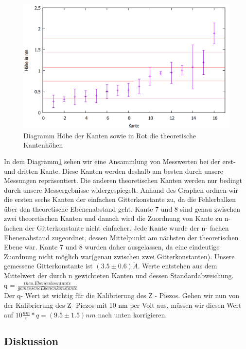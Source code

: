 \documentclass[10pt,a4paper]{article}
\begin{document}
\begin{figure}[]
	\includegraphics[scale = 0.5]{kantendiag.png}
	\centering
	\caption{Diagramm Höhe der Kanten sowie in Rot die theoretische Kantenhöhen}
	\label{kantendia}
\end{figure}

In dem Diagramm\ref{kantendia} sehen wir eine Ansammlung von Messwerten bei der erst- und dritten Kante. Diese Kanten werden deshalb am besten durch unsere Messungen repräsentiert. Die anderen theoretischen Kanten werden nur bedingt durch unsere Messergebnisse widergespiegelt.
Anhand des Graphen ordnen wir die ersten sechs Kanten der einfachen Gitterkonstante zu, da die Fehlerbalken über den theoretische Ebenenabstand geht. Kante 7 und 8 sind genau zwischen zwei theoretischen Kanten und danach wird die Zuordnung von Kante zu n-fachen der Gitterkonstante nicht einfacher.
Jede Kante wurde der n- fachen Ebenenabstand zugeordnet, dessen Mittelpunkt am nächsten der theoretischen Ebene war. Kante 7 und 8 wurden daher ausgelassen, da eine eindeutige Zuordnung nicht möglich war(genau zwischen zwei Gitterkonstanten). Unsere gemessene Gitterkonstante ist $(3.5 \pm 0.6) \mathring{A}$. Werte entstehen aus dem Mittelwert der durch n gewichteten Kanten und dessen Standardabweichung. \\ 
q =  $\frac {theo. Ebenenkosntante} {gemessene Ebenenkonstante}$\\
Der q- Wert ist wichtig für die Kalibrierung des Z - Piezos.
Gehen wir nun von der Kalibrierung des Z- Piezos mit 10 nm per Volt aus, müssen wir diesen Wert auf $10 \frac {nm} {v} * q = (9.5 \pm1.5)nm$ nach unten korrigieren.



\subsection{ Diskussion}
\end{document}
